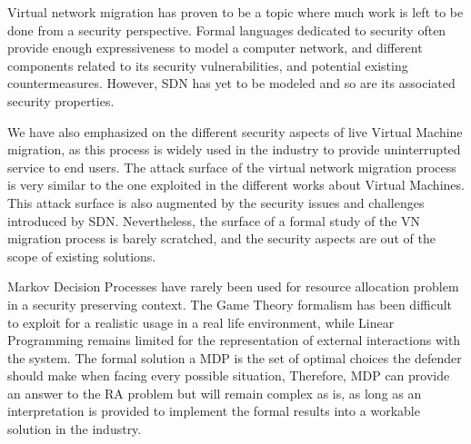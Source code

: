 Virtual network migration has proven to be a topic where much work is left to be done from a security perspective. 
Formal languages dedicated to security often provide enough expressiveness to model a computer network, and different components related to its security vulnerabilities, and potential existing countermeasures.
However, SDN has yet to be modeled and so are its associated security properties.

We have also emphasized on the different security aspects of live Virtual Machine migration, as this process is widely used in the industry to provide uninterrupted service to end users. 
The attack surface of the virtual network migration process is very similar to the one exploited in the different works about Virtual Machines. This attack surface is also augmented by the security issues and challenges introduced by SDN. Nevertheless, the surface of a formal study of the VN migration process is barely scratched, and the security aspects are out of the scope of existing solutions.

Markov Decision Processes have rarely been used for resource allocation problem in a security preserving context. The Game Theory formalism has been difficult to exploit for a realistic usage in a real life environment, while Linear Programming remains limited for the representation of external interactions with the system. The formal solution a MDP is the set of optimal choices the defender should make when facing every possible situation,  Therefore, MDP can provide an answer to the RA problem but will remain complex as is, as long as an interpretation is provided to implement the formal results into a workable solution in the industry.